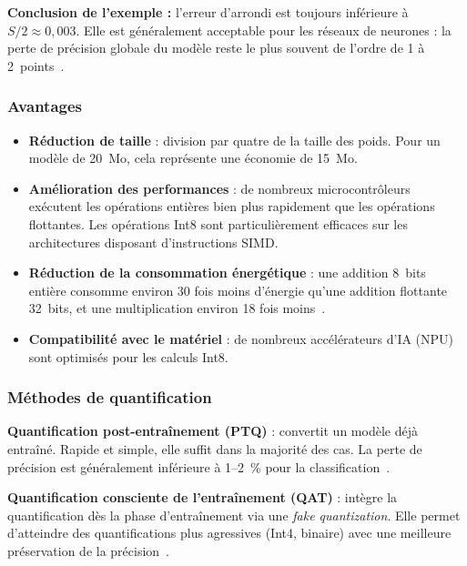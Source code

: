 \textbf{Conclusion de l'exemple :} l'erreur d'arrondi est toujours inférieure
à $S/2 \approx 0{,}003$. Elle est généralement acceptable pour les réseaux de
neurones : la perte de précision globale du modèle reste le plus souvent de
l'ordre de 1 à 2~points~\cite{jacob2018quantization,krishnamoorthi2018}.

\subsubsection{Avantages}
\begin{itemize}
  \item \textbf{Réduction de taille} : division par quatre de la taille des
        poids. Pour un modèle de 20~Mo, cela représente une économie de 15~Mo.
  \item \textbf{Amélioration des performances} : de nombreux microcontrôleurs
        exécutent les opérations entières bien plus rapidement que les opérations
        flottantes. Les opérations Int8 sont particulièrement efficaces sur les
        architectures disposant d'instructions SIMD.
  \item \textbf{Réduction de la consommation énergétique} : une addition 8~bits
        entière consomme environ 30 fois moins d'énergie qu'une addition
        flottante 32~bits, et une multiplication environ 18 fois
        moins~\cite{horowitz2014energy}.
  \item \textbf{Compatibilité avec le matériel} : de nombreux accélérateurs d'IA
        (NPU) sont optimisés pour les calculs Int8.
\end{itemize}

\subsubsection{Méthodes de quantification}

\textbf{Quantification post-entraînement (PTQ)} : convertit un modèle déjà
entraîné. Rapide et simple, elle suffit dans la majorité des cas. La perte de
précision est généralement inférieure à 1--2~\% pour la
classification~\cite{krishnamoorthi2018}.

\textbf{Quantification consciente de l'entraînement (QAT)} : intègre la
quantification dès la phase d'entraînement via une \emph{fake quantization}.
Elle permet d'atteindre des quantifications plus agressives (Int4, binaire)
avec une meilleure préservation de la précision~\cite{jacob2018quantization}.

